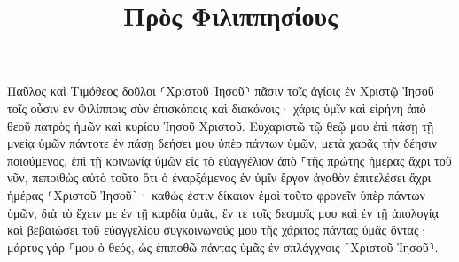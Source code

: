 \documentclass{openreader}
\title{Πρὸς Φιλιππησίους}
\date{}
\begin{document}
\maketitle
\raggedbottom 
\fontsize{16pt}{24pt}\selectfont


Παῦλος καὶ Τιμόθεος δοῦλοι ⸂Χριστοῦ Ἰησοῦ⸃ πᾶσιν τοῖς ἁγίοις ἐν Χριστῷ Ἰησοῦ τοῖς οὖσιν ἐν Φιλίπποις σὺν ἐπισκόποις καὶ διακόνοις· 
χάρις ὑμῖν καὶ εἰρήνη ἀπὸ θεοῦ πατρὸς ἡμῶν καὶ κυρίου Ἰησοῦ Χριστοῦ. 
Εὐχαριστῶ τῷ θεῷ μου ἐπὶ πάσῃ τῇ μνείᾳ ὑμῶν 
πάντοτε ἐν πάσῃ δεήσει μου ὑπὲρ πάντων ὑμῶν, μετὰ χαρᾶς τὴν δέησιν ποιούμενος, 
ἐπὶ τῇ κοινωνίᾳ ὑμῶν εἰς τὸ εὐαγγέλιον ἀπὸ ⸀τῆς πρώτης ἡμέρας ἄχρι τοῦ νῦν, 
πεποιθὼς αὐτὸ τοῦτο ὅτι ὁ ἐναρξάμενος ἐν ὑμῖν ἔργον ἀγαθὸν ἐπιτελέσει ἄχρι ἡμέρας ⸂Χριστοῦ Ἰησοῦ⸃· 
καθώς ἐστιν δίκαιον ἐμοὶ τοῦτο φρονεῖν ὑπὲρ πάντων ὑμῶν, διὰ τὸ ἔχειν με ἐν τῇ καρδίᾳ ὑμᾶς, ἔν τε τοῖς δεσμοῖς μου καὶ ἐν τῇ ἀπολογίᾳ καὶ βεβαιώσει τοῦ εὐαγγελίου συγκοινωνούς μου τῆς χάριτος πάντας ὑμᾶς ὄντας· 
μάρτυς γάρ ⸀μου ὁ θεός, ὡς ἐπιποθῶ πάντας ὑμᾶς ἐν σπλάγχνοις ⸂Χριστοῦ Ἰησοῦ⸃. 
\end{document}
